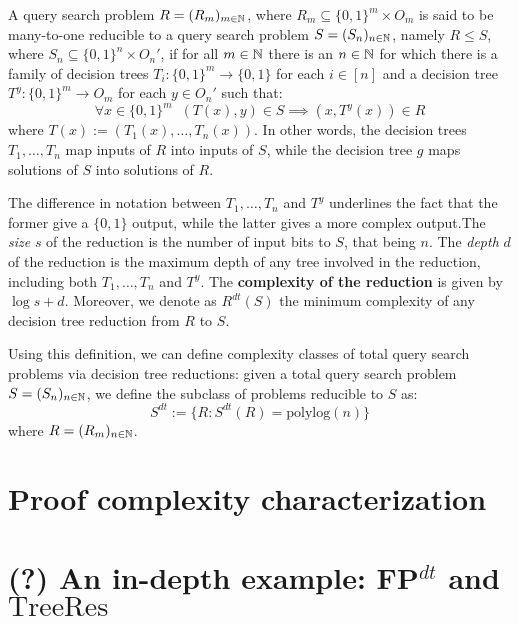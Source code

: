 \begin{definition}
    A query search problem $R = (R_m)_{m \in \mathbb{N}}$, where $R_m \subseteq \{0,1\}^m \times O_m$ is said to be many-to-one reducible to a query search problem $S = (S_n)_{n \in \mathbb{N}}$, namely $R \leq S$, where $S_n \subseteq \{0,1\}^n \times O_n'$, if for all $m \in \mathbb{N}$ there is an $n \in \mathbb{N}$ for which there is a family of decision trees $T_i : \{0,1\}^m \to \{0,1\}$ for each $i \in [n]$ and a decision tree $T^y : \{0,1\}^m \to O_m$ for each $y \in O_n'$ such that:
    \[\forall x \in \{0,1\}^m \;\; (T(x), y) \in S \implies (x, T^y(x)) \in R\]
    where $T(x) := (T_1(x), \ldots, T_n(x))$. In other words, the decision trees $T_1, \ldots, T_n$ map inputs of $R$ into inputs of $S$, while the decision tree $g$ maps solutions of $S$ into solutions of $R$. 
\end{definition}

The difference in notation between $T_1, \ldots, T_n$ and $T^y$ underlines the fact that the former give a $\{0,1\}$ output, while the latter gives a more complex output.The \textit{size} $s$ of the reduction is the number of input bits to $S$, that being $n$. The \textit{depth} $d$ of the reduction is the maximum depth of any tree involved in the reduction, including both $T_1, \ldots, T_n$ and $T^y$. The \textbf{complexity of the reduction} is given by $\log s + d$. Moreover, we denote as $R^{dt}(S)$ the minimum complexity of any decision tree reduction from $R$ to $S$.

\newpage

Using this definition, we can define complexity classes of total query search problems via decision tree reductions: given a total query search problem $S = (S_n)_{n \in \mathbb{N}}$, we define the subclass of problems reducible to $S$ as:
\[S^{dt} := \{R : S^{dt}(R) = \mathrm{polylog}(n)\}\]
where $R = (R_m)_{n \in \mathbb{N}}$.

\section{Proof complexity characterization}

\section{(?) An in-depth example: \textsf{FP}$^{dt}$ and $\mathrm{TreeRes}$}

\cleardoublepage